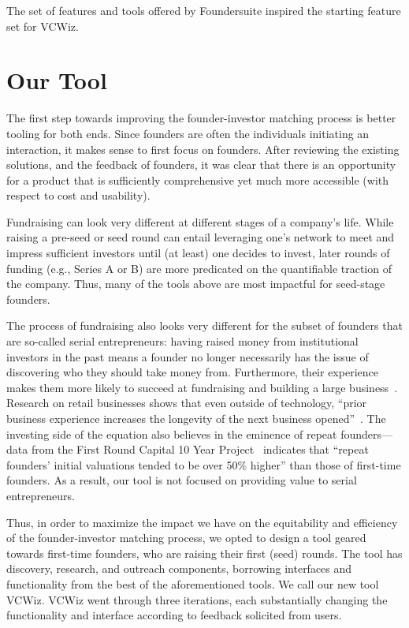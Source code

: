 The set of features and tools offered by Foundersuite inspired the starting feature set for VCWiz.

\section{Our Tool}
\label{chap3:tool}

The first step towards improving the founder-investor matching process is better tooling for both ends. Since founders are often the individuals initiating an interaction, it makes sense to first focus on founders. After reviewing the existing solutions, and the feedback of founders, it was clear that there is an opportunity for a product that is sufficiently comprehensive yet much more accessible (with respect to cost and usability).

Fundraising can look very different at different stages of a company's life. While raising a pre-seed or seed round can entail leveraging one's network to meet and impress sufficient investors until (at least) one decides to invest, later rounds of funding (e.g., Series A or B) are more predicated on the quantifiable traction of the company. Thus, many of the tools above are most impactful for seed-stage founders.

The process of fundraising also looks very different for the subset of founders that are so-called serial entrepreneurs: having raised money from institutional investors in the past means a founder no longer necessarily has the issue of discovering who they should take money from. Furthermore, their experience makes them more likely to succeed at fundraising and building a large business~\cite{gompers2010performance}. Research on retail businesses shows that even outside of technology, ``prior business experience increases the longevity of the next business opened''~\cite{doi:10.1086/683820}. The investing side of the equation also believes in the eminence of repeat founders---data from the First Round Capital 10 Year Project~\cite{first-round-10-years} indicates that ``repeat founders' initial valuations tended to be over 50\% higher'' than those of first-time founders. As a result, our tool is not focused on providing value to serial entrepreneurs.

Thus, in order to maximize the impact we have on the equitability and efficiency of the founder-investor matching process, we opted to design a tool geared towards first-time founders, who are raising their first (seed) rounds. The tool has discovery, research, and outreach components, borrowing interfaces and functionality from the best of the aforementioned tools. We call our new tool VCWiz. VCWiz went through three iterations, each substantially changing the functionality and interface according to feedback solicited from users.

